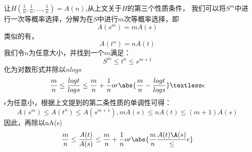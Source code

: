 让$H(\frac{1}{n},\frac{1}{n},...,\frac{1}{n})=A(n)$,从上文关于$H$的第三个性质条件，
我们可以将$S^m$中进行一次等概率选择，分解为在$S$中进行$m$次等概率选择，即
\begin{equation}
A(s^m)=mA(s)
\end{equation}
类似的有，
\begin{equation}
A(t^n)=nA(t)
\end{equation}
我们令$n$为任意大小，并找到一个$m$满足：
\begin{equation}
S^m\leq t^n\leq s^{m+1}
\end{equation}
化为对数形式并除以$nlogs$
\begin{equation}
\frac{m}{n}\leq \frac{logt}{logs}\leq \frac{m}{n}+\frac{1}{n} or \abs{\frac{m}{n}-\frac{logt}{logs}}\textless \epsilon
\end{equation}
$\epsilon$为任意小，根据上文提到的第二条性质的单调性可得：
\begin{equation}
A(s^m)\leq A(t^n) \leq A(s^{m+1}), mA(s)\leq nA(t) \leq (m+1)A(s)
\end{equation}
因此，再除以nA(s)
\begin{equation}
\frac{m}{n}\leq \frac{A(t)}{A(s)}\leq \frac{m}{n}+\frac{1}{n} or \abs{\frac{m}{n}\frac{A(t)\A(s)}\leq \epsilon}
\end{equation}
